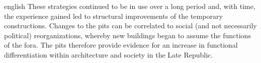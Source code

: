 \begin{foreignlanguage}{english}
These strategies continued to be in use over a long period and, with time, the experience gained led to structural improvements of the temporary constructions. Changes to the pits can be correlated to social (and not necessarily political) reorganizations, whereby new buildings began to assume the functions of the fora. The pits therefore provide evidence for an increase in functional differentiation within architecture and society in the Late Republic.
\end{foreignlanguage}
